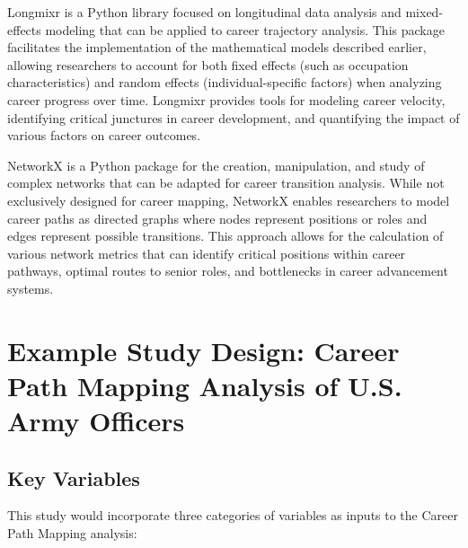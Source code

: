 \documentclass{article}
\begin{document}
Longmixr is a Python library focused on longitudinal data analysis and mixed-effects modeling that can be applied to career trajectory analysis. This package facilitates the implementation of the mathematical models described earlier, allowing researchers to account for both fixed effects (such as occupation characteristics) and random effects (individual-specific factors) when analyzing career progress over time. Longmixr provides tools for modeling career velocity, identifying critical junctures in career development, and quantifying the impact of various factors on career outcomes.

NetworkX is a Python package for the creation, manipulation, and study of complex networks that can be adapted for career transition analysis. While not exclusively designed for career mapping, NetworkX enables researchers to model career paths as directed graphs where nodes represent positions or roles and edges represent possible transitions. This approach allows for the calculation of various network metrics that can identify critical positions within career pathways, optimal routes to senior roles, and bottlenecks in career advancement systems.

\section{Example Study Design: Career Path Mapping Analysis of U.S. Army Officers}

\subsection{Key Variables}
This study would incorporate three categories of variables as inputs to the Career Path Mapping analysis:
\end{document}
